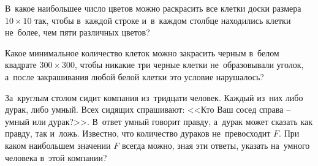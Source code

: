\begin{problems}
\item
В~какое наибольшее число цветов можно раскрасить все клетки доски размера
$10 \times 10$ так, чтобы в~каждой строке и~в~каждом столбце находились клетки
не~более, чем пяти различных цветов?

\item
Какое минимальное количество клеток можно закрасить черным в~белом квадрате
$300 \times 300$, чтобы никакие три черные клетки не~образовывали уголок,
а~после закрашивания любой белой клетки это условие нарушалось?

\item
За~круглым столом сидит компания из~тридцати человек.
Каждый из~них либо дурак, либо умный.
Всех сидящих спрашивают: <<Кто Ваш сосед справа -- умный или дурак?>>.
В~ответ умный говорит правду, а~дурак может сказать как правду, так и~ложь.
Известно, что количество дураков не~превосходит $F$.
При каком наибольшем значении $F$ всегда можно, зная эти ответы, указать
на~умного человека в~этой компании?

\end{problems}

